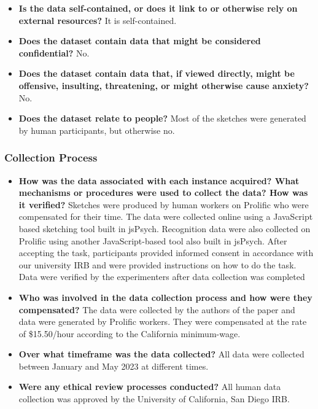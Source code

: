 \documentclass{article}
\begin{document}
\begin{itemize}
    \item \textbf{Is the data self-contained, or does it link to or otherwise rely on external resources? } It is self-contained.

    \item \textbf{Does the dataset contain data that might be considered confidential?} No.
    
    \item \textbf{Does the dataset contain data that, if viewed directly, might be offensive, insulting, threatening, or might otherwise cause anxiety?} No.
    \item \textbf{Does the dataset relate to people?} Most of the sketches were generated by human participants, but otherwise no.


\end{itemize}
\subsubsection{Collection Process}
\begin{itemize}
    \item \textbf{How was the data associated with each instance acquired? What mechanisms or procedures were used to collect the data? How was it verified?} Sketches were produced by human workers on Prolific who were compensated for their time. The data were collected online using a JavaScript based sketching tool built in jsPsych.
    Recognition data were also collected on Prolific using another JavaScript-based tool also built in jsPsych. 
    After accepting the task, participants provided informed consent in accordance with our university IRB and were provided instructions on how to do the task.
    Data were verified by the experimenters after data collection was completed
    \item \textbf{Who was involved in the data collection process and how were they compensated?} The data were collected by the authors of the paper and data were generated by Prolific workers. They were compensated at the rate of \$15.50/hour according to the California minimum-wage.
    \item \textbf{Over what timeframe was the data collected?} All data were collected between January and May 2023 at different times.
    \item \textbf{Were any ethical review processes conducted?} All human data collection was approved by the University of California, San Diego IRB.
    
\end{itemize}
\end{document}
